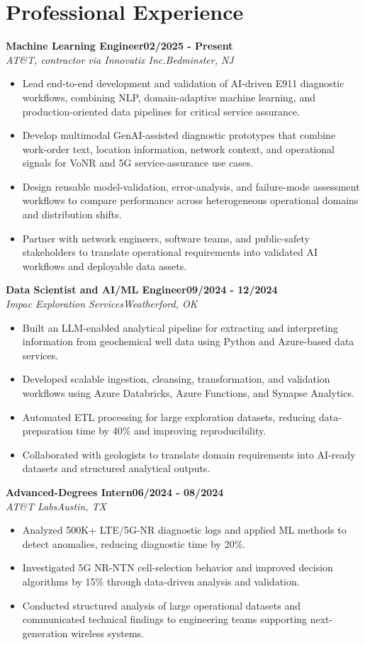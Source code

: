 \documentclass[9pt,letterpaper]{extarticle}
\newcommand{\role}[4]{%
  \Needspace{4\baselineskip}\textbf{#1}\hfill\textbf{#2}\\[-1pt]
  \textit{#3}\hfill\textit{#4}\par}
\begin{document}
\section{Professional Experience}
\role{Machine Learning Engineer}{02/2025 - Present}{AT\&T, contractor via Innovatix Inc.}{Bedminster, NJ}
\begin{itemize}
\item Lead end-to-end development and validation of AI-driven E911 diagnostic workflows, combining NLP, domain-adaptive machine learning, and production-oriented data pipelines for critical service assurance.
\item Develop multimodal GenAI-assisted diagnostic prototypes that combine work-order text, location information, network context, and operational signals for VoNR and 5G service-assurance use cases.
\item Design reusable model-validation, error-analysis, and failure-mode assessment workflows to compare performance across heterogeneous operational domains and distribution shifts.
\item Partner with network engineers, software teams, and public-safety stakeholders to translate operational requirements into validated AI workflows and deployable data assets.
\end{itemize}
\role{Data Scientist and AI/ML Engineer}{09/2024 - 12/2024}{Impac Exploration Services}{Weatherford, OK}
\begin{itemize}
\item Built an LLM-enabled analytical pipeline for extracting and interpreting information from geochemical well data using Python and Azure-based data services.
\item Developed scalable ingestion, cleansing, transformation, and validation workflows using Azure Databricks, Azure Functions, and Synapse Analytics.
\item Automated ETL processing for large exploration datasets, reducing data-preparation time by 40\% and improving reproducibility.
\item Collaborated with geologists to translate domain requirements into AI-ready datasets and structured analytical outputs.
\end{itemize}
\role{Advanced-Degrees Intern}{06/2024 - 08/2024}{AT\&T Labs}{Austin, TX}
\begin{itemize}
\item Analyzed 500K+ LTE/5G-NR diagnostic logs and applied ML methods to detect anomalies, reducing diagnostic time by 20\%.
\item Investigated 5G NR-NTN cell-selection behavior and improved decision algorithms by 15\% through data-driven analysis and validation.
\item Conducted structured analysis of large operational datasets and communicated technical findings to engineering teams supporting next-generation wireless systems.
\end{itemize}
\end{document}
